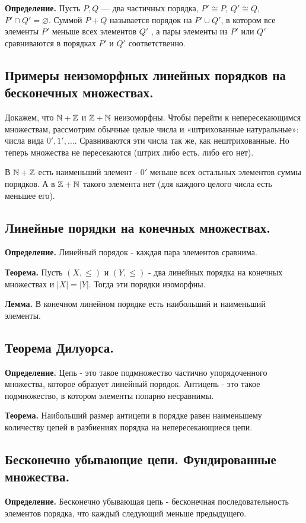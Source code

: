 \documentclass[a4paper, 10pt]{article}
\begin{document}
\textbf{Определение.} Пусть $P, Q$ — два частичных порядка, $P' \cong P$, $Q' \cong Q$, $P' \cap Q' = \varnothing$. Суммой $P + Q$ называется порядок на $P' \cup Q'$, в котором все элементы $P'$ меньше всех элементов $Q'$ , а пары элементы из $P'$ или $Q'$ сравниваются в порядках $P'$ и $Q'$ соответственно.

\subsection{Примеры неизоморфных линейных порядков на бесконечных множествах.}

Докажем, что $\mathbb{N} + \mathbb{Z}$ и $\mathbb{Z} + \mathbb{N}$ неизоморфны. Чтобы перейти к непересекающимся множествам, рассмотрим обычные целые числа и «штрихованные натуральные»: числа вида $0', 1', \dots$. Сравниваются эти числа так же, как нештрихованные. Но теперь множества не пересекаются (штрих либо есть, либо его нет).

В $\mathbb{N} + \mathbb{Z}$ есть наименьший элемент - $0'$ меньше всех остальных элементов суммы порядков. А в $\mathbb{Z} + \mathbb{N}$ такого элемента нет (для каждого целого числа есть меньшее его).

\subsection{Линейные порядки на конечных множествах.}
\textbf{Определение.} Линейный порядок - каждая пара элементов сравнима.

\textbf{Теорема.} Пусть $(X, \leqslant)$ и $(Y, \leqslant)$ - два линейных порядка на конечных множествах и $|X| = |Y|$. Тогда эти порядки изоморфны.

\textbf{Лемма.} В конечном линейном порядке есть наибольший и наименьший элементы.

\subsection{Теорема Дилуорса.}

\textbf{Определение.} Цепь - это такое подмножество частично упорядоченного множества, которое образует линейный порядок. Антицепь - это такое подмножество, в котором элементы попарно несравнимы.

\textbf{Теорема.} Наибольший размер антицепи в порядке равен наименьшему количеству цепей в разбиениях порядка на непересекающиеся цепи.

\subsection{Бесконечно убывающие цепи. Фундированные множества.}
\textbf{Определение.} Бесконечно убывающая цепь - бесконечная последовательность элементов порядка, что каждый следующий меньше предыдущего.
\end{document}

